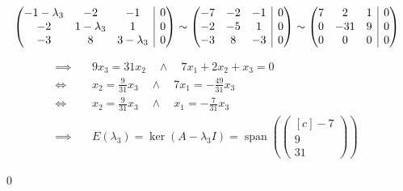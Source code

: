 \documentclass[answers]{exam}
\makeatletter
\newenvironment{sysmatrix}[1]
  {\left(\begin{array}{@{}#1@{}}}
  {\end{array}\right)}
\newcommand{\vektor}[1]{\begin{pmatrix*}[c] #1 \end{pmatrix*}}
\makeatother
\begin{document}
\begin{questions}
\begin{solution}
\begin{itemize}
$$\begin{sysmatrix}{ccc|c}
                          -1 - \lambda_3 & -2 & -1 & 0 \\
                          -2 & 1 - \lambda_3 & 1 & 0 \\
                          -3 & 8 & 3 - \lambda_3 & 0
                      \end{sysmatrix}
                      \sim
                      \begin{sysmatrix}{ccc|c}
                          -7 & -2 & -1 & 0 \\
                          -2 & -5 & 1 & 0 \\
                          -3 & 8 & -3 & 0
                      \end{sysmatrix}
                      \sim
                      \begin{sysmatrix}{ccc|c}
                          7 & 2 & 1 & 0 \\
                          0 & -31 & 9 & 0 \\
                          0 & 0 & 0 & 0
                      \end{sysmatrix}
                  $$

                  $$
                      \begin{aligned}
                          \implies \quad & 9x_3 = 31x_2 \quad \land \quad 7x_1 + 2x_2 + x_3 = 0                        \\
                          \iff \quad     & x_2 = \frac{9}{31}x_3 \quad \land \quad 7x_1 = -\frac{49}{31}x_3            \\
                          \iff \quad     & x_2 = \frac{9}{31}x_3 \quad \land \quad x_1 = -\frac{7}{31}x_3              \\
                          \implies \quad & E(\lambda_3) = \ker(A - \lambda_3 I) = \operatorname{span}\left( \vektor{-7 \\ 9 \\ 31} \right)
                      \end{aligned}
                  $$
        \end{itemize}
        \qed
    \end{solution}
\end{questions}
\end{document}
